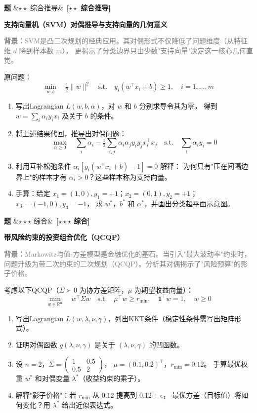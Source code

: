 \documentclass[12pt, a4paper]{article}
\newcounter{probcnt}
\newenvironment{problem}[1][]{%
  \stepcounter{probcnt}
  \begin{mdframed}[linecolor=black!30, backgroundcolor=gray!4,
    innertopmargin=8pt, innerbottommargin=8pt,
    innerleftmargin=10pt, innerrightmargin=10pt,
    skipabove=10pt, skipbelow=4pt]
  \noindent\textbf{题 \theprobcnt}\ifx&#1&\else\ \textbf{[#1]}\fi\quad
}{%
  \end{mdframed}
}
\newenvironment{subproblems}{%
  \begin{enumerate}[label=(\alph*), leftmargin=1.5em, topsep=4pt, itemsep=2pt]
}{%
  \end{enumerate}
}
\newcommand{\context}[1]{\smallskip\noindent\textcolor{gray}{\small \textbf{背景：}#1}\smallskip}
\begin{document}
\begin{problem}[$\star\star$ 综合推导]
\textbf{支持向量机（SVM）对偶推导与支持向量的几何意义}

\context{SVM是凸二次规划的经典应用。其对偶形式不仅降低了问题维度（从特征维 $d$ 降到样本数 $m$），
更揭示了分类边界只由少数"支持向量"决定这一核心几何直觉。}

原问题：
\[
  \min_{w, b} \quad \tfrac{1}{2}\|w\|^2 \quad \text{s.t.} \quad y_i(w^\top x_i + b) \geq 1,
  \quad i = 1, \ldots, m
\]

\begin{subproblems}
  \item 写出Lagrangian $L(w, b, \alpha)$，对 $w$ 和 $b$ 分别求导令其为零，
        得到 $w = \sum_i \alpha_i y_i x_i$ 及关于 $b$ 的条件。
  \item 将上述结果代回，推导出对偶问题：
        \[
          \max_{\alpha \geq 0} \quad \sum_i \alpha_i - \tfrac{1}{2}\sum_{i,j}\alpha_i\alpha_j y_i y_j x_i^\top x_j
          \quad \text{s.t.} \quad \sum_i \alpha_i y_i = 0
        \]
  \item 利用互补松弛条件 $\alpha_i[y_i(w^\top x_i + b) - 1] = 0$ 解释：
        为何只有"压在间隔边界上"的样本才有 $\alpha_i > 0$？这些样本称为支持向量。
  \item 手算：给定 $x_1=(1,0),y_1=+1$；$x_2=(0,1),y_2=+1$；$x_3=(-1,0),y_3=-1$，
        求 $w^*$，$b^*$ 和 $\alpha^*$，并画出分类超平面示意图。
\end{subproblems}
\end{problem}

\begin{problem}[$\star\star\star$ 综合]
\textbf{带风险约束的投资组合优化（QCQP）}

\context{Markowitz均值-方差模型是金融优化的基石。当引入"最大波动率"约束时，
问题升级为带二次约束的二次规划（QCQP）。分析其对偶揭示了"风险预算"的影子价格。}

考虑以下QCQP（$\Sigma \succ 0$ 为协方差矩阵，$\mu$ 为期望收益向量）：
\[
  \min_{w \in \mathbb{R}^n} \quad w^\top \Sigma w \quad \text{s.t.} \quad
  \mu^\top w \geq r_{\min},\quad \mathbf{1}^\top w = 1,\quad w \geq 0
\]

\begin{subproblems}
  \item 写出Lagrangian $L(w, \lambda, \nu, \gamma)$，列出KKT条件（稳定性条件需写出矩阵形式）。
  \item 证明对偶函数 $g(\lambda, \nu, \gamma)$ 是关于 $(\lambda, \nu, \gamma)$ 的凹函数。
  \item 设 $n=2$，$\Sigma = \begin{pmatrix}1 & 0.5 \\ 0.5 & 2\end{pmatrix}$，
        $\mu = (0.1, 0.2)^\top$，$r_{\min} = 0.12$。
        手算最优权重 $w^*$ 和对偶变量 $\lambda^*$（收益约束的乘子）。
  \item 解释"影子价格"：若 $r_{\min}$ 从 $0.12$ 提高到 $0.12 + \epsilon$，
        最优方差（目标值）将如何变化？用 $\lambda^*$ 给出近似表达式。
\end{subproblems}
\end{problem}
\end{document}
